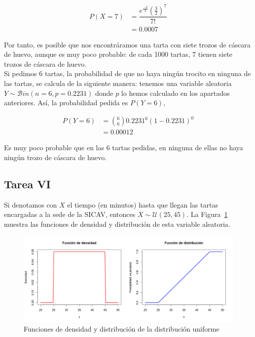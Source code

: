\documentclass[12pt,a4paper,twoside,openright,titlepage,final]{article}
\begin{document}
\begin{align*}
P(X=7) & = \dfrac{e^{\frac{-3}{2}} \left(\frac{3}{2}\right)^7}{7!} \\ & = 0.0007
\end{align*}

Por tanto, es posible que nos encontráramos una tarta con siete trozos de cáscara de huevo, aunque es muy poco probable: de cada 1000 tartas, 7 tienen siete trozos de cáscara de huevo.\\

Si pedimos 6 tartas, la probabilidad de que no haya ningún trocito en ninguna de las tartas, se calcula de la siguiente manera: tenemos una variable aleatoria $Y \sim \mathcal{B}in(n=6, p = 0.2231)$ donde $p$ lo hemos calculado en los apartados anteriores. Así, la probabilidad pedida es $P(Y = 6)$,

\begin{align*}
P(Y=6) & = \binom{6}{6}0.2231^6 (1-0.2231)^0 \\ & = 0.00012
\end{align*}

Es muy poco probable que en las 6 tartas pedidas, en ninguna de ellas no haya ningún trozo de cáscara de huevo.

\subsection{Tarea VI}

Si denotamos con $X$ el tiempo (en minutos) hasta que llegan las tartas encargadas a la sede de la SICAV, entonces $X \sim \mathcal{U}(25,45)$. La Figura~\ref{fig:funcion_distribucion_uniforme} muestra las funciones de densidad y distribución de esta variable aleatoria.\\


\begin{figure}[tbph!]
\centering
\includegraphics[width=0.9\linewidth]{imagenes/funcion_distribucion_uniforme}
\caption{Funciones de densidad y distribución de la distribución uniforme}
\label{fig:funcion_distribucion_uniforme}
\end{figure}
\end{document}
